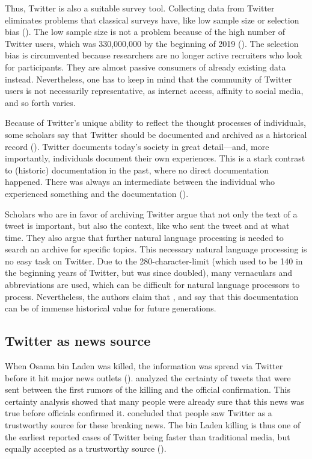 Thus, Twitter is also a suitable survey tool. Collecting data from Twitter eliminates problems that classical surveys have, like low sample size or selection bias (\cite{takabeTwitterSurveyTool2016}). The low sample size is not a problem because of the high number of Twitter users, which was 330,000,000 by the beginning of 2019 (\cite{TwitterMonthlyActive}). The selection bias is circumvented because researchers are no longer active recruiters who look for participants. They are almost passive consumers of already existing data instead. Nevertheless, one has to keep in mind that the community of Twitter users is not necessarily representative, as internet access, affinity to social media, and so forth varies. %

Because of Twitter's unique ability to reflect the thought processes of individuals, some scholars say that Twitter should be documented and archived as a historical record (\cite{risse2014documenting}). Twitter documents today's society in great detail---and, more importantly, individuals document their own experiences. This is a stark contrast to (historic) documentation in the past, where no direct documentation happened. There was always an intermediate between the individual who experienced something and the documentation (\citeauthor{risse2014documenting}).

Scholars who are in favor of archiving Twitter argue that not only the text of a tweet is important, but also the context, like who sent the tweet and at what time. They also argue that further natural language processing is needed to search an archive for specific topics. This necessary natural language processing is no easy task on Twitter. Due to the 280-character-limit (which used to be 140 in the beginning years of Twitter, but was since doubled), many vernaculars and abbreviations are used, which can be difficult for natural language processors to process. Nevertheless, the authors claim that  \parencite[9]{risse2014documenting}, and say that this documentation can be of immense historical value for future generations.

\subsection{Twitter as news source}  %
When Osama bin Laden was killed, the information was spread via Twitter before it hit major news outlets (\cite{hu2012breaking}). \citeauthor{hu2012breaking} analyzed the certainty of tweets that were sent between the first rumors of the killing and the official confirmation. This certainty analysis showed that many people were already sure that this news was true before officials confirmed it. \citeauthor{hu2012breaking} concluded that people saw Twitter as a trustworthy source for these breaking news. The bin Laden killing is thus one of the earliest reported cases of Twitter being faster than traditional media, but equally accepted as a trustworthy source (\cite[2751]{hu2012breaking}).

